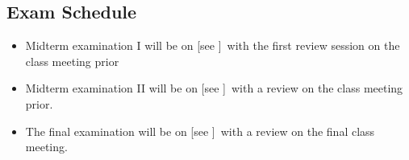 
\subsection*{Exam Schedule}\label{subsec:exam_schedule}

\begin{itemize}
\itemsep -0.0em 
\item Midterm examination I will be on [see \coursewebpagelink]~with the first review session on the class meeting prior
\item Midterm examination II will be on [see \coursewebpagelink]~with a review on the class meeting prior.
\item The final examination will be on [see \coursewebpagelink]~with a review on the final class meeting.
\end{itemize}
